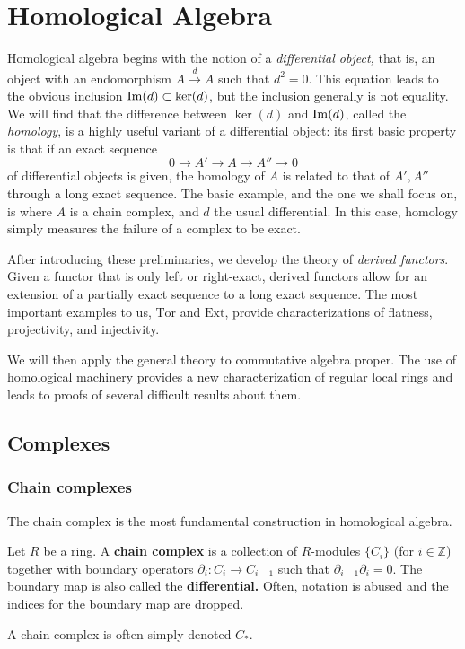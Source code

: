 \chapter{Homological Algebra}
\label{homological}


Homological algebra begins with the notion of a \emph{differential object,}
that is, an object with an endomorphism $A \stackrel{d}{\to} A$ such that $d^2 =
0$. This equation leads to the obvious inclusion $\operatorname{Im}(d) \subset \ker(d)$, but
the inclusion generally is not equality. We will find that the difference
between $\ker(d)$ and $\operatorname{Im}(d)$, called the \emph{homology}, is a highly useful
variant of a differential object: its first basic property is that if an exact
sequence
\[ 0 \to A' \to A \to A'' \to 0  \]
of differential objects is given, the homology of $A$ is related to that of
$A', A''$ through a long exact sequence. The basic example, and the one we
shall focus on, is where $A$ is a
chain complex, and $d$ the usual differential.
In this case, homology simply measures the failure of a complex to be exact.

After introducing these preliminaries, we develop the theory of \emph{derived
functors}. Given a functor that is only left or right-exact, derived functors
allow for an extension of a partially exact sequence to a long exact sequence.
The most important examples to us, $\mathrm{Tor}$ and $\mathrm{Ext}$, provide
characterizations of flatness, projectivity, and injectivity.

We will then apply the general theory to commutative algebra proper. The use
of homological machinery provides a new characterization of regular local
rings and leads to proofs of several difficult results about them.

\section{Complexes}


\subsection{Chain complexes}
The chain complex is the most fundamental construction in
homological algebra.

\begin{definition} Let $R$ be a ring. A \textbf{chain complex} is a collection
of $R$-modules
$\{C_i\}$ (for $i \in \mathbb{Z}$)
together with boundary
operators
$\partial_i:C_i\rightarrow C_{i-1}$ such that
$\partial_{i-1}\partial_i=0$. The boundary map is also
called the
\textbf{differential.} Often, notation is abused and the indices for
the boundary map are dropped.

A chain complex is often simply denoted $C_*$.
\end{definition}


